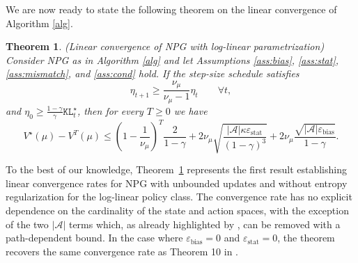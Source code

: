 \documentclass[a4paper,12pt]{article}
\newtheorem{theorem}{Theorem}
\numberwithin{theorem}{section}
\newcommand\A{\mathcal{A}}
\newcommand\1{\mathbf{1}}
\newcommand\KL{\mathtt{KL}}
\newcommand{\norm}[1]{\left\lVert #1 \right\rVert}
\begin{document}
We are now ready to state the following theorem on the linear convergence of Algorithm \ref{alg}.
\begin{theorem} (Linear convergence of NPG with log-linear parametrization)
	\label{thm}
	Consider NPG as in Algorithm \ref{alg} and let Assumptions \ref{ass:bias}, \ref{ass:stat}, \ref{ass:mismatch}, and \ref{ass:cond} hold. If the step-size schedule satisfies \[\eta_{t+1}\geq \frac{\nu_\mu}{\nu_\mu-1}\eta_t \qquad \forall t,\] and $\eta_0\geq\frac{1-\gamma}{\gamma}\KL_t^\star$, then for every $T\geq 0$ we have
	\[  V^\star(\mu)-V^T(\mu)\leq\left(1-\frac{1}{\nu_\mu}\right)^T\frac{2}{1-\gamma}+2\nu_\mu\sqrt{\frac{|\A|\kappa\varepsilon_\text{stat}}{(1-\gamma)^3}}+ 2\nu_\mu\frac{\sqrt{|\A|\varepsilon_\text{bias}}}{1-\gamma}.\]
\end{theorem}
To the best of our knowledge, Theorem~\ref{thm} represents the first result establishing linear convergence rates for NPG with unbounded updates and without entropy regularization for the log-linear policy class. The convergence rate has no explicit dependence on the cardinality of the state and action spaces, with the exception of the two $|\A|$ terms which, as already highlighted by \cite{RN265}, can be removed with a path-dependent bound. In the case where $\varepsilon_\text{bias} = 0$ and $\varepsilon_\text{stat} = 0$, the theorem recovers the same convergence rate as Theorem 10 in \cite{RN266}.

\end{document}

